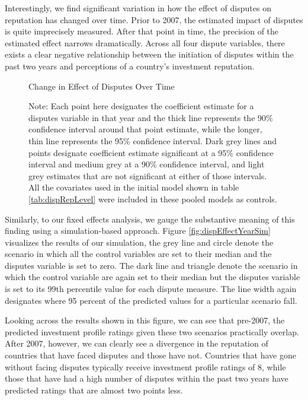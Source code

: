 \documentclass[12pt,onesided]{amsart}
\begin{document}
Interestingly, we find significant variation in how the effect of disputes on reputation has changed over time. Prior to 2007, the estimated impact of disputes is quite imprecisely measured. After that point in time, the precision of the estimated effect narrows dramatically. Across all four dispute variables, there exists a clear negative relationship between the initiation of disputes within the past two years and perceptions of a country's investment reputation. 

\begin{figure}[ht]
	\vspace{4cm}
	\centering
	\caption{Change in Effect of Disputes Over Time}
	\label{fig:dispEffectYear}
	\resizebox{1\textwidth}{!}{}
	\caption*{Note: Each point here designates the coefficient estimate for a disputes variable in that year and the thick line represents the 90\% confidence interval around that point estimate, while the longer, thin line represents the 95\% confidence interval. Dark grey lines and points designate coefficient estimate significant at a 95\% confidence interval and medium grey at a 90\% confidence interval, and light grey estimates that are not significant at either of those intervals. All the covariates used in the initial model shown in table \ref{tab:dispRepLevel} were included in these pooled models as controls.}
\end{figure}

Similarly, to our fixed effects analysis, we gauge the substantive meaning of this finding using a simulation-based approach. Figure \ref{fig:dispEffectYearSim} visualizes the results of our simulation, the grey line and circle denote the scenario in which all the control variables are set to their median and the disputes variable is set to zero. The dark line and triangle denote the scenario in which the control variable are again set to their median but the disputes variable is set to its 99th percentile value for each dispute measure. The line width again designates where 95 percent of the predicted values for a particular scenario fall. 

Looking across the results shown in this figure, we can see that pre-2007, the predicted investment profile ratings given these two scenarios practically overlap. After 2007, however, we can clearly see a divergence in the reputation of countries that have faced disputes and those have not. Countries that have gone without facing disputes typically receive investment profile ratings of 8, while those that have had a high number of disputes within the past two years have predicted ratings that are almost two points less. 
\end{document}
